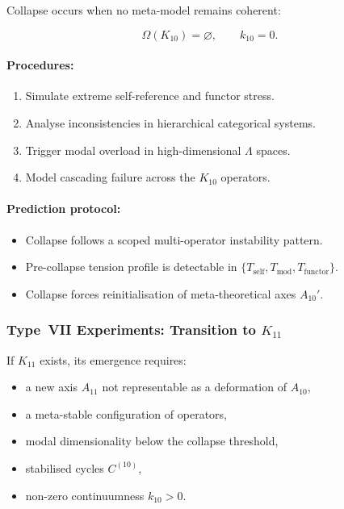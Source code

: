 Collapse occurs when no meta-model remains coherent:

\[
    \Omega(K_{10}) = \varnothing,\qquad k_{10} = 0.
\]

\paragraph{Procedures:}

\begin{enumerate}
    \item Simulate extreme self-reference and functor stress.
    \item Analyse inconsistencies in hierarchical categorical systems.
    \item Trigger modal overload in high-dimensional $\Lambda$ spaces.
    \item Model cascading failure across the $K_{10}$ operators.
\end{enumerate}

\paragraph{Prediction protocol:}

\begin{itemize}
    \item Collapse follows a scoped multi-operator instability pattern.
    \item Pre-collapse tension profile is detectable in
          $\{T_{\mathrm{self}}, T_{\mathrm{mod}}, T_{\mathrm{functor}}\}$.
    \item Collapse forces reinitialisation of meta-theoretical axes
          $A_{10}'$.
\end{itemize}



\subsubsection{Type~VII Experiments: Transition to $K_{11}$}

If $K_{11}$ exists, its emergence requires:

\begin{itemize}
    \item a new axis $A_{11}$ not representable as
          a deformation of $A_{10}$,
    \item a meta-stable configuration of operators,
    \item modal dimensionality below the collapse threshold,
    \item stabilised cycles $C^{(10)}$,
    \item non-zero continuumness $k_{10} > 0$.
\end{itemize}

